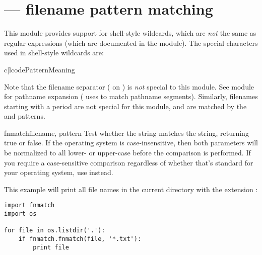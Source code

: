 \section{ ---
         \UNIX{} filename pattern matching}




This module provides support for \UNIX{} shell-style wildcards, which
are \emph{not} the same as regular expressions (which are documented
in the  module).  The special
characters used in shell-style wildcards are:

\begin{tableii}{c|l}{code}{Pattern}{Meaning}
\end{tableii}

Note that the filename separator ( on \UNIX) is \emph{not}
special to this module.  See module
 for pathname expansion
( uses  to match pathname
segments).  Similarly, filenames starting with a period are
not special for this module, and are matched by the \code{*} and
 patterns.


\begin{funcdesc}{fnmatch}{filename, pattern}
Test whether the  string matches the 
string, returning true or false.  If the operating system is
case-insensitive, then both parameters will be normalized to all
lower- or upper-case before the comparison is performed.  If you
require a case-sensitive comparison regardless of whether that's
standard for your operating system, use 
instead.

This example will print all file names in the current directory with the
extension :

\begin{verbatim}
import fnmatch
import os

for file in os.listdir('.'):
    if fnmatch.fnmatch(file, '*.txt'):
        print file
\end{verbatim}

\end{funcdesc}

